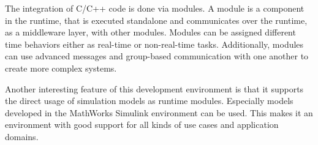 The integration of C/C++ code is done via modules.
A module is a component in the runtime, that is executed standalone and communicates over the runtime, as a middleware layer, with other modules.
Modules can be assigned different time behaviors either as real-time or non-real-time tasks.
Additionally, modules can use advanced messages and group-based communication with one another to create more complex systems.

Another interesting feature of this development environment is that it supports the direct usage of simulation models as runtime modules.
Especially models developed in the MathWorks Simulink environment can be used.
This makes it an environment with good support for all kinds of use cases and application domains.
